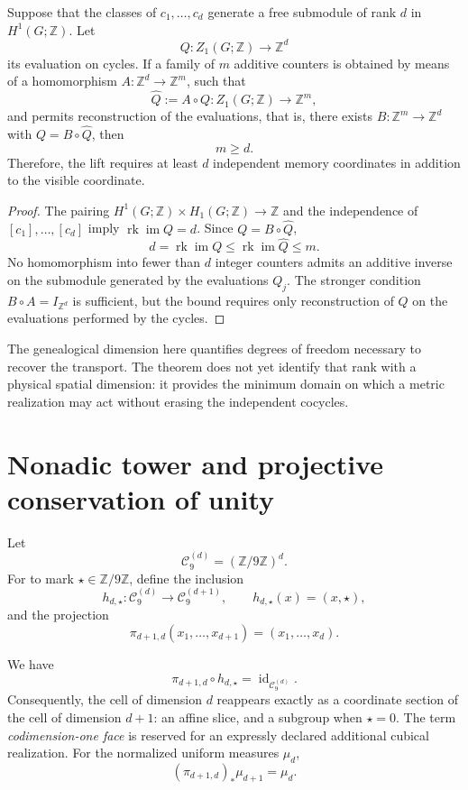 \begin{theorem}
\label{thm:rango-dimensional-cohomologico-rev2}
Suppose that the classes of \(c_1,\ldots,c_d\) generate a free submodule of
rank \(d\) in \(H^1(G;\mathbb Z)\). Let
\[
 Q:Z_1(G;\mathbb Z)\longrightarrow\mathbb Z^d
\]
its evaluation on cycles. If a family of \(m\) additive counters is
obtained by means of a homomorphism \(A:\mathbb Z^d\to\mathbb Z^m\), such
that
\[
 \widehat Q:=A\circ Q:Z_1(G;\mathbb Z)\longrightarrow\mathbb Z^m,
\]
and permits reconstruction of the evaluations, that is, there exists
\(B:\mathbb Z^m\to\mathbb Z^d\) with
\(Q=B\circ\widehat Q\), then
\[
 \boxed{m\geq d}.
\]
Therefore, the lift requires at least \(d\) independent memory coordinates
in addition to the visible coordinate.
\end{theorem}

\begin{proof}
The pairing
\(H^1(G;\mathbb Z)\times H_1(G;\mathbb Z)\to\mathbb Z\) and the independence
of \([c_1],\ldots,[c_d]\) imply
\(\operatorname{rk}\operatorname{im}Q=d\). Since
\(Q=B\circ\widehat Q\),
\[
 d=\operatorname{rk}\operatorname{im}Q
 \leq\operatorname{rk}\operatorname{im}\widehat Q\leq m.
\]
No homomorphism into fewer than \(d\) integer counters admits an
additive inverse on the submodule generated by the evaluations \(Q_j\).
The stronger condition \(B\circ A=I_{\mathbb Z^d}\) is sufficient, but the
bound requires only reconstruction of \(Q\) on the evaluations
performed by the cycles.
\end{proof}

The genealogical dimension here quantifies degrees of freedom necessary to
recover the transport. The theorem does not yet identify that rank with a
physical spatial dimension: it provides the minimum domain on which a
metric realization may act without erasing the independent cocycles.

\section{Nonadic tower and projective conservation of unity}

Let
\[
 \mathcal C_9^{(d)}=(\mathbb Z/9\mathbb Z)^d.
\]
For to mark \(\star\in\mathbb Z/9\mathbb Z\), define the inclusion
\[
 h_{d,\star}:\mathcal C_9^{(d)}\longrightarrow
 \mathcal C_9^{(d+1)},
 \qquad h_{d,\star}(x)=(x,\star),
\]
and the projection
\[
 \pi_{d+1,d}(x_1,\ldots,x_{d+1})=(x_1,\ldots,x_d).
\]

\begin{proposition}
\label{prop:conservacion-elevacion-dimensional-rev2}
We have
\[
 \pi_{d+1,d}\circ h_{d,\star}=\operatorname{id}_{\mathcal C_9^{(d)}}.
\]
Consequently, the cell of dimension \(d\) reappears exactly as a
coordinate section of the cell of dimension \(d+1\): an affine slice, and a
subgroup when \(\star=0\). The term \emph{codimension-one face} is
reserved for an expressly declared additional cubical realization. For the normalized
uniform measures \(\mu_d\),
\[
 (\pi_{d+1,d})_*\mu_{d+1}=\mu_d.
\]
\end{proposition}


